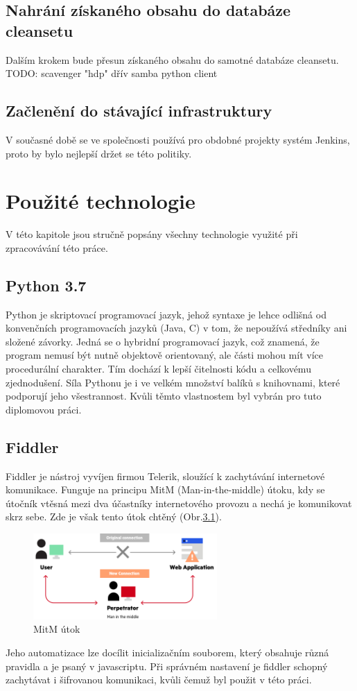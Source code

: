 \documentclass[thesis=M,czech,hidelinks]{FITthesis}[2013/05/06]
\begin{document}
\section{Nahrání získaného obsahu do databáze cleansetu}
Dalším krokem bude přesun získaného obsahu do samotné databáze cleansetu. TODO: scavenger "hdp" dřív samba python client 





\section{Začlenění do stávající infrastruktury}
V současné době se ve společnosti používá pro obdobné projekty systém Jenkins, proto by bylo nejlepší držet se této politiky.






\chapter{Použité technologie}
V této kapitole jsou stručně popsány všechny technologie využité při zpracovávání této práce.
\section{Python 3.7}\label{sec:python}
Python je skriptovací programovací jazyk, jehož syntaxe je lehce odlišná od konvenčních programovacích jazyků (Java, C) v tom, že nepoužívá středníky ani složené závorky. Jedná se o hybridní programovací jazyk, což znamená, že program nemusí být nutně objektově orientovaný, ale části mohou mít více procedurální charakter. Tím dochází k lepší čitelnosti kódu a celkovému zjednodušení. Síla Pythonu je i ve velkém množství balíků s knihovnami, které podporují jeho všestrannost. Kvůli těmto vlastnostem byl vybrán pro tuto diplomovou práci.

\section{Fiddler}\label{sec:fiddler}
Fiddler je nástroj vyvíjen firmou Telerik, sloužící k zachytávání internetové komunikace. Funguje na principu MitM (Man-in-the-middle) útoku, kdy se útočník vtěsná mezi dva účastníky internetového provozu a nechá je komunikovat skrz sebe. Zde je však tento útok chtěný (Obr.\ref{fig:mitm}).
\begin{figure}[h]
	\centering
	\includegraphics[width=7cm]{pictures/mitm.png}
	\caption{MitM útok \cite{mitm}}
	\label{fig:mitm}
\end{figure}
Jeho automatizace lze docílit inicializačním souborem, který obsahuje různá pravidla a je psaný v javascriptu. Při správném nastavení je fiddler schopný zachytávat i šifrovanou komunikaci, kvůli čemuž byl použit v této práci.
\end{document}

